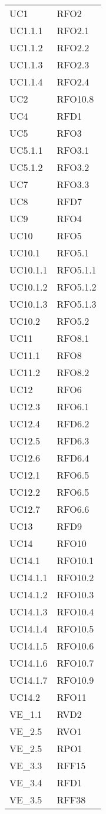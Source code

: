 \begin{longtable}{ >{\centering}p{}
			>{\centering}p{}}
UC1	&	RFO2	\tabularnewline
UC1.1.1 & RFO2.1 \tabularnewline
UC1.1.2 & RFO2.2 \tabularnewline
UC1.1.3 & RFO2.3 \tabularnewline
UC1.1.4 & RFO2.4 \tabularnewline
UC2 & RFO10.8 \tabularnewline
UC4 & RFD1 \tabularnewline
UC5 & RFO3 \tabularnewline
UC5.1.1 & RFO3.1 \tabularnewline
UC5.1.2 & RFO3.2 \tabularnewline
UC7 & RFO3.3 \tabularnewline
UC8 & RFD7 \tabularnewline
UC9 & RFO4 \tabularnewline
UC10 & RFO5 \tabularnewline
UC10.1 & RFO5.1 \tabularnewline
UC10.1.1 & RFO5.1.1 \tabularnewline
UC10.1.2 & RFO5.1.2 \tabularnewline
UC10.1.3 & RFO5.1.3 \tabularnewline
UC10.2 & RFO5.2 \tabularnewline
UC11 & RFO8.1 \tabularnewline
UC11.1 & RFO8 \tabularnewline
UC11.2 & RFO8.2 \tabularnewline
UC12 & RFO6 \tabularnewline
UC12.3 & RFO6.1 \tabularnewline
UC12.4 & RFD6.2 \tabularnewline
UC12.5 & RFD6.3 \tabularnewline
UC12.6 & RFD6.4 \tabularnewline
UC12.1 & RFO6.5 \tabularnewline
UC12.2 & RFO6.5 \tabularnewline
UC12.7 & RFO6.6 \tabularnewline
UC13 & RFD9 \tabularnewline
UC14 & RFO10 \tabularnewline
UC14.1 & RFO10.1 \tabularnewline
UC14.1.1 & RFO10.2 \tabularnewline
UC14.1.2 & RFO10.3 \tabularnewline
UC14.1.3 & RFO10.4 \tabularnewline
UC14.1.4 & RFO10.5 \tabularnewline
UC14.1.5 & RFO10.6 \tabularnewline
UC14.1.6 & RFO10.7 \tabularnewline
UC14.1.7 & RFO10.9 \tabularnewline
UC14.2 & RFO11 \tabularnewline
VE\_1.1 & RVD2 \tabularnewline
VE\_2.5 & RVO1 \tabularnewline
VE\_2.5 & RPO1 \tabularnewline
VE\_3.3 & RFF15 \tabularnewline
VE\_3.4 & RFD1 \tabularnewline
VE\_3.5 & RFF38 \tabularnewline

	
	\end{longtable}
